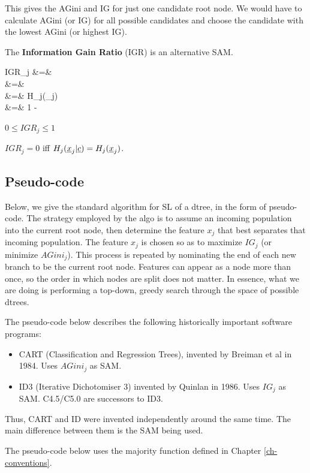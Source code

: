 This gives
the AGini and IG for just one 
candidate root node.
We would have
to calculate
AGini (or IG) for all
possible candidates
and choose the candidate
with the lowest AGini (or highest IG).

The {\bf Information Gain Ratio} (IGR) is an alternative SAM.

\beqa
IGR_j
&=&
\\
&=&
\\
&=&
{H_j(\rvx_j)}
\\
&=&
1 -\;
\eeqa

$0\leq IGR_j\leq 1$

$IGR_j=0$ iff $H_j(\rvx_j |\rvc)=H_j(\rvx_j)$.




\subsection{Pseudo-code}

Below,
we give the standard
algorithm for SL
of a dtree, in the form
of pseudo-code.
The strategy
employed by
the algo
is to assume an incoming
population into the current root node,
then
determine the feature $x_j$
 that best separates that 
incoming
population. The feature
$x_j$ is chosen so as to maximize
$IG_j$
(or minimize $AGini_j$). This
process is repeated by nominating
the end of each new branch to be
the current root node.
Features can appear as a node 
more than once, so the order in 
which nodes are split does not matter.
In essence, what we are doing is
performing a top-down, greedy search
through the space of possible dtrees.

The pseudo-code below describes the following 
historically important
software programs:
\begin{itemize}
\item CART (Classification and Regression Trees),
invented by Breiman et al in 1984. Uses $AGini_j$ as SAM.
\item
ID3 (Iterative Dichotomiser 3)
invented by Quinlan in 1986. Uses $IG_j$ as SAM.
C4.5/C5.0 are successors to ID3.
\end{itemize}

Thus, CART and ID were 
invented independently around the same time.
The main difference between them is the SAM
being used.


The pseudo-code below
uses the majority function
defined in Chapter \ref{ch-conventions}.


